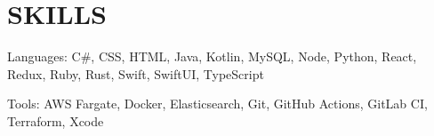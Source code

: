 \section{SKILLS}
\begin{bulletlist}
   \item{Languages: C\#, CSS, HTML, Java, Kotlin, MySQL, Node, Python, React, Redux, Ruby, Rust, Swift, SwiftUI, TypeScript}
   \item{Tools: AWS Fargate, Docker, Elasticsearch, Git, GitHub Actions, GitLab CI, Terraform, Xcode}
\end{bulletlist}
